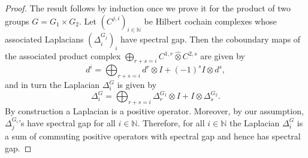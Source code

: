 \documentclass[a4paper,leqno,12pt]{article}
\numberwithin{equation}{section}
\theoremstyle{plain}
\theoremstyle{definition}
\theoremstyle{remark}
\begin{document}
    \begin{proof}
    	The result follows by induction once we prove it for the product of two groups $G = G_1 \times G_2$. 
    	Let $(C^{j,i})_{i\in \mathbb N}$ be Hilbert cochain complexes whose associated Laplacians $(\Delta_i^{G_j})_i$ have spectral gap. Then the coboundary maps of the associated product complex
    	$\bigoplus_{r+s=i} C^{1,r} \hat{\otimes} C^{2,s}$
    	are given by
    	\[
    		d^i = \bigoplus_{r+s=i} d^r \otimes I + (-1)^s I \otimes d^s,
    	\]
    	and in turn the Laplacian $\Delta^G_i$ is given by 
    	\begin{equation*} \label{equ:Delta_n}
    		\Delta^G_i = \bigoplus_{r+s=i} \Delta^{G_1}_r \otimes I + I \otimes \Delta^{G_2}_s.
    	\end{equation*}
     	By construction a Laplacian is a positive operator. Moreover, by our assumption, $\Delta_j ^{G_i}$'s have spectral gap for all $i\in \mathbb N$. Therefore, for all $i\in \mathbb N$ the Laplacian $\Delta_i ^ {G}$ is a sum of commuting positive operators with spectral gap and hence has spectral gap. 	
    \end{proof}	
	
\end{document}
